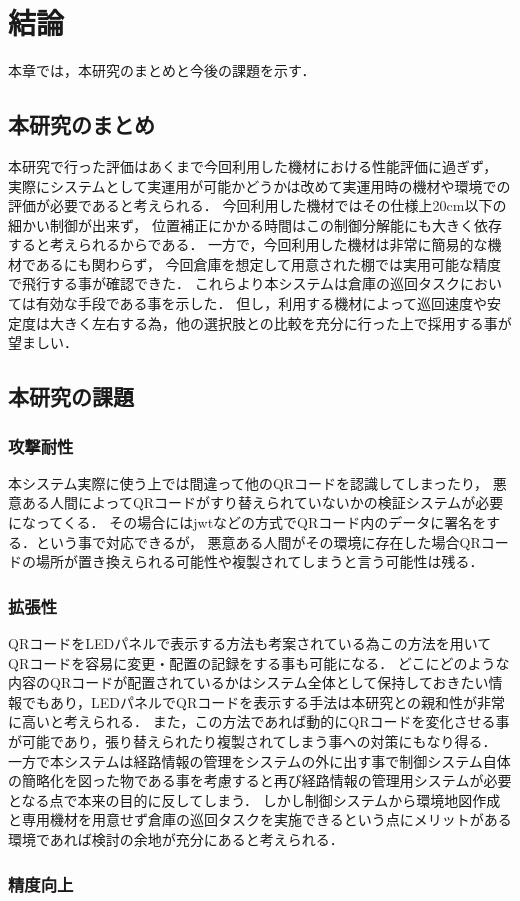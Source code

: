 \chapter{結論}
\label{conclusion}

本章では，本研究のまとめと今後の課題を示す．

\section{本研究のまとめ}
本研究で行った評価はあくまで今回利用した機材における性能評価に過ぎず，
実際にシステムとして実運用が可能かどうかは改めて実運用時の機材や環境での評価が必要であると考えられる．
今回利用した機材ではその仕様上20cm以下の細かい制御が出来ず，
位置補正にかかる時間はこの制御分解能にも大きく依存すると考えられるからである．
一方で，今回利用した機材は非常に簡易的な機材であるにも関わらず，
今回倉庫を想定して用意された棚では実用可能な精度で飛行する事が確認できた．
これらより本システムは倉庫の巡回タスクにおいては有効な手段である事を示した．
但し，利用する機材によって巡回速度や安定度は大きく左右する為，他の選択肢との比較を充分に行った上で採用する事が望ましい．


\section{本研究の課題}
\subsection{攻撃耐性}
本システム実際に使う上では間違って他のQRコードを認識してしまったり，
悪意ある人間によってQRコードがすり替えられていないかの検証システムが必要になってくる．
その場合にはjwtなどの方式でQRコード内のデータに署名をする．という事で対応できるが，
悪意ある人間がその環境に存在した場合QRコードの場所が置き換えられる可能性や複製されてしまうと言う可能性は残る．

\subsection{拡張性}
QRコードをLEDパネルで表示する方法\cite{led_qr}も考案されている為この方法を用いてQRコードを容易に変更・配置の記録をする事も可能になる．
どこにどのような内容のQRコードが配置されているかはシステム全体として保持しておきたい情報でもあり，LEDパネルでQRコードを表示する手法は本研究との親和性が非常に高いと考えられる．
また，この方法であれば動的にQRコードを変化させる事が可能であり，張り替えられたり複製されてしまう事への対策にもなり得る．
一方で本システムは経路情報の管理をシステムの外に出す事で制御システム自体の簡略化を図った物である事を考慮すると再び経路情報の管理用システムが必要となる点で本来の目的に反してしまう．
しかし制御システムから環境地図作成と専用機材を用意せず倉庫の巡回タスクを実施できるという点にメリットがある環境であれば検討の余地が充分にあると考えられる．

\subsection{精度向上}




